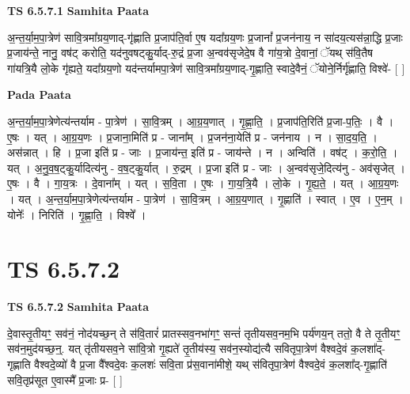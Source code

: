 \documentclass[17pt]{extarticle}
\begin{document}
\textbf{TS 6.5.7.1 } \newline
\textbf{Samhita Paata} \newline

अ॒न्त॒र्या॒म॒पा॒त्रेण॑ सावि॒त्रमा᳚ग्रय॒णाद्-गृ॑ह्णाति प्र॒जाप॑ति॒र्वा ए॒ष यदा᳚ग्रय॒णः प्र॒जानां᳚ प्र॒जन॑नाय॒ न सा॑दय॒त्यस॑न्ना॒द्धि प्र॒जाः प्र॒जाय॑न्ते॒ नानु॒ वष॑ट् करोति॒ यद॑नुवषट्कु॒र्याद्-रु॒द्रं प्र॒जा अ॒न्वव॑सृजेदे॒ष वै गा॑य॒त्रो दे॒वानां॒ ॅयथ् स॑वि॒तैष गा॑यत्रि॒यै लो॒के गृ॑ह्यते॒ यदा᳚ग्रय॒णो यद॑न्तर्यामपा॒त्रेण॑ सावि॒त्रमा᳚ग्रय॒णाद्-गृ॒ह्णाति॒ स्वादे॒वैनं॒ ॅयोने॒र्निर्गृ॑ह्णाति॒ विश्वे॑- [  ] \newline

\textbf{Pada Paata} \newline

अ॒न्त॒र्या॒म॒पा॒त्रेणेत्य॑न्तर्याम - पा॒त्रेण॑ । सा॒वि॒त्रम् । आ॒ग्र॒य॒णात् । गृ॒ह्णा॒ति॒ । प्र॒जाप॑ति॒रिति॑ प्र॒जा-प॒तिः॒ । वै । ए॒षः । यत् । आ॒ग्र॒य॒णः । प्र॒जाना॒मिति॑ प्र - जाना᳚म् । प्र॒जन॑ना॒येति॑ प्र - जन॑नाय । न । सा॒द॒य॒ति॒ । अस॑न्नात् । हि । प्र॒जा इति॑ प्र - जाः । प्र॒जाय॑न्त॒ इति॑ प्र - जाय॑न्ते । न । अन्विति॑ । वष॑ट् । क॒रो॒ति॒ । यत् । अ॒नु॒व॒ष॒ट्कु॒र्यादित्य॑नु - व॒ष॒ट्कु॒र्यात् । रु॒द्रम् । प्र॒जा इति॑ प्र - जाः । अ॒न्वव॑सृजे॒दित्य॑नु - अव॑सृजेत् । ए॒षः । वै । गा॒य॒त्रः । दे॒वाना᳚म् । यत् । स॒वि॒ता । ए॒षः । गा॒य॒त्रि॒यै । लो॒के । गृ॒ह्य॒ते॒ । यत् । आ॒ग्र॒य॒णः । यत् । अ॒न्त॒र्या॒म॒पा॒त्रेणेत्य॑न्तर्याम - पा॒त्रेण॑ । सा॒वि॒त्रम् । आ॒ग्र॒य॒णात् । गृ॒ह्णाति॑ । स्वात् । ए॒व । ए॒न॒म् । योनेः᳚ । निरिति॑ । गृ॒ह्णा॒ति॒ । विश्वे᳚ ।  \newline





\section{ TS 6.5.7.2 }

\textbf{TS 6.5.7.2 } \newline
\textbf{Samhita Paata} \newline

दे॒वास्तृ॒तीयꣳ॒॒ सव॑नं॒ नोद॑यच्छ॒न् ते स॑वि॒तारं॑ प्रातस्सव॒नभा॑गꣳ॒॒ सन्तं॑ तृतीयसव॒नम॒भि पर्य॑णय॒न् ततो॒ वै ते तृ॒तीयꣳ॒॒ सव॑न॒मुद॑यच्छ॒न्॒. यत् तृ॑तीयसव॒ने सा॑वि॒त्रो गृ॒ह्यते॑ तृ॒तीय॑स्य॒ सव॑न॒स्योद्य॑त्यै सवितृपा॒त्रेण॑ वैश्वदे॒वं क॒लशा᳚द्-गृह्णाति वैश्वदे॒व्यो॑ वै प्र॒जा वै᳚श्वदे॒वः क॒लशः॑ सवि॒ता प्र॑स॒वाना॑मीशे॒ यथ् स॑वितृपा॒त्रेण॑ वैश्वदे॒वं क॒लशा᳚द्-गृ॒ह्णाति॑ सवि॒तृप्र॑सूत ए॒वास्मै᳚ प्र॒जाः प्र- [  ] \newline
\end{document}
